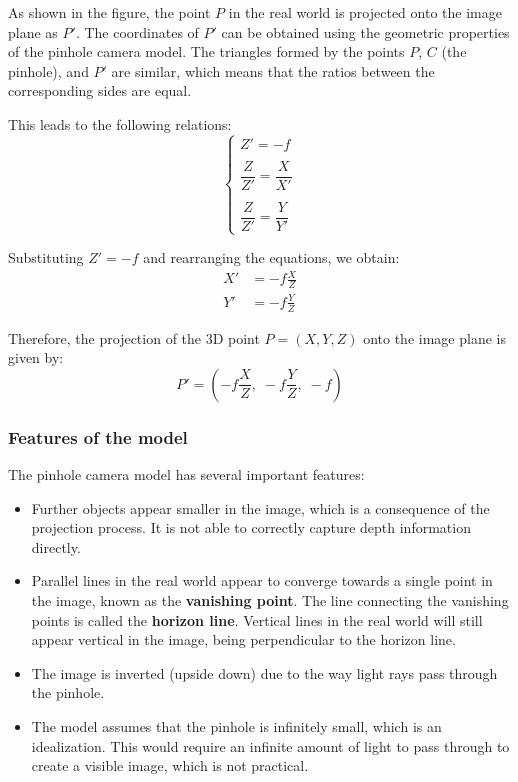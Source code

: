 \vspace{1em}
As shown in the figure, the point $P$ in the real world is projected onto the image plane as $P'$. The coordinates of $P'$ can be obtained using the geometric properties of the pinhole camera model. The triangles formed by the points $P$, $C$ (the pinhole), and $P'$ are similar, which means that the ratios between the corresponding sides are equal.

This leads to the following relations:
\begin{equation*}
\begin{cases}
Z' = -f \\\\
\dfrac{Z}{Z'} = \dfrac{X}{X'} \\\\
\dfrac{Z}{Z'} = \dfrac{Y}{Y'}
\end{cases}
\end{equation*}

Substituting $Z' = -f$ and rearranging the equations, we obtain:
\begin{align*}
X' &= -f \frac{X}{Z} \\
Y' &= -f \frac{Y}{Z}
\end{align*}

Therefore, the projection of the 3D point $P=(X,Y,Z)$ onto the image plane is given by:
\[
P' = \left(-f \frac{X}{Z},\; -f \frac{Y}{Z},\; -f\right)
\]

\subsubsection{Features of the model}
The pinhole camera model has several important features:
\begin{itemize}
    \item Further objects appear smaller in the image, which is a consequence of the projection process. It is not able to correctly capture depth information directly.
    \item Parallel lines in the real world appear to converge towards a single point in the image, known as the \textbf{vanishing point}. The line connecting the vanishing points is called the \textbf{horizon line}. Vertical lines in the real world will still appear vertical in the image, being perpendicular to the horizon line.
    \item The image is inverted (upside down) due to the way light rays pass through the pinhole.
    \item The model assumes that the pinhole is infinitely small, which is an idealization. This would require an infinite amount of light to pass through to create a visible image, which is not practical.
\end{itemize}

